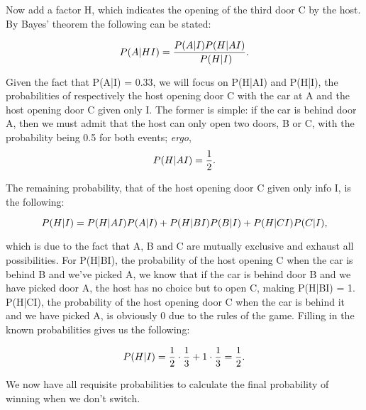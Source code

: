 Now add a factor H, which indicates the opening of the third door C by the
host. By Bayes' theorem the following can be stated:

\begin{equation}
  \\P(A|HI) = \frac{\\P(A|I) \\P(H|AI)}{\\P(H|I)}.
\end{equation}

Given the fact that P(A|I) = 0.33, we will focus on P(H|AI) and P(H|I), the
probabilities of respectively the host opening door C with the car at A and the
host opening door C given only I. The former is simple: if the car is behind
door A, then we must admit that the host can only open two doors, B or C, with
the probability being 0.5 for both events; \textit{ergo}, 
\begin{equation}
\\P(H|AI) = \frac{1}{2}.
\end{equation}

The remaining probability, that of the host opening door C given only info I, is the following:

\begin{equation}
\\P(H|I) = \\P(H|AI)\\P(A|I) + \\P(H|BI)\\P(B|I) + \\P(H|CI)\\P(C|I),
\end{equation}

which is due to the fact that A, B and C are mutually exclusive and exhaust all
possibilities. For P(H|BI), the probability of the host opening C when the car
is behind B and we've picked A, we know that if the car is behind door B and we
have picked door A, the host has no choice but to open C, making P(H|BI) = 1.
P(H|CI), the probability of the host opening door C when the car is behind it
and we have picked A, is obviously 0 due to the rules of the game.  Filling in
the known probabilities gives us the following:

\begin{equation}
  \\P(H|I) = \frac{1}{2} \cdot \frac{1}{3} + 1 \cdot \frac{1}{3} = \frac{1}{2}.
\end{equation}

We now have all requisite probabilities to calculate the final probability of winning when we don't switch.

